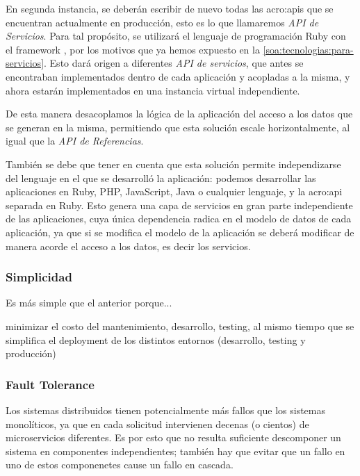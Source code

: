 En segunda instancia, se deberán escribir de nuevo todas las \glspl{acro:api} que se encuentran actualmente en producción, esto es lo que llamaremos \textit{API de Servicios}. Para tal propósito, se utilizará el lenguaje de programación Ruby con el framework , por los motivos que ya hemos expuesto en la \autoref{soa:tecnologias:para-servicios}. Esto dará origen a diferentes \textit{API de servicios}, que antes se encontraban implementados dentro de cada aplicación y acopladas a la misma, y ahora estarán implementados en una instancia virtual independiente.

De esta manera desacoplamos la lógica de la aplicación del acceso a los datos que se generan en la misma, permitiendo que esta solución escale horizontalmente, al igual que la \textit{API de Referencias}.

También se debe que tener en cuenta que esta solución permite independizarse del lenguaje en el que se desarrolló la aplicación: podemos desarrollar las aplicaciones en Ruby, PHP, JavaScript, Java o cualquier lenguaje, y la \gls{acro:api} separada en Ruby. Esto genera una capa de servicios en gran parte independiente de las aplicaciones, cuya única dependencia radica en el modelo de datos de cada aplicación, ya que si se modifica el modelo de la aplicación se deberá modificar de manera acorde el acceso a los datos, es decir los servicios.


\subsubsection{Simplicidad}

Es más simple que el anterior porque...

minimizar el costo del mantenimiento, desarrollo, testing, al mismo tiempo que se simplifica el deployment de los distintos entornos (desarrollo, testing y producción)

\subsubsection{Fault Tolerance}

Los sistemas distribuidos tienen potencialmente más fallos que los sistemas monolíticos, ya que en cada solicitud intervienen decenas (o cientos) de microservicios diferentes\cite[p.~48]{stin2015}. Es por esto que no resulta suficiente descomponer un sistema en componentes independientes; también hay que evitar que un fallo en uno de estos componenetes cause un fallo en cascada\cite[p.~4]{stin2015}.

